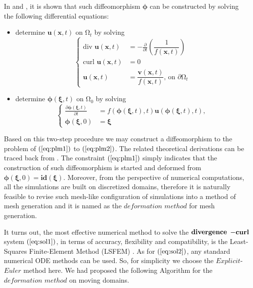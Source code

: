 \documentclass{article}
\theoremstyle{definition}
\theoremstyle{remark}
\numberwithin{equation}{section}
\numberwithin{subsection}{section}
\begin{document}
In \cite{Cai} and \cite{Dion}, it is shown that such diffeomorphism $\pmb{\phi}$ can be constructed by solving the following differential equations: 
	\begin{itemize}
	\item determine $\pmb{u}(\pmb{x},t)$ on $\mathrm{\Omega}_t$ by solving
	\begin{equation}\label{eq:sol1}
	\left\{
		\begin{aligned}
		\text{div } \pmb{u}(\pmb{x},t)& = -\frac{\partial}{\partial t}(\dfrac{1}{f(\pmb{x},t)}) \\
		\text{curl } \pmb{u}(\pmb{x},t)& = 0\\
		\pmb{u}(\pmb{x},t)& = \dfrac{\pmb{v}(\pmb{x},t)}{f(\pmb{x},t)} \text{, on } \partial\mathrm{\Omega}_t
		\end{aligned}\right.
	\end{equation}
	\item determine $\pmb{\phi}(\pmb{\xi},t)$ on $\mathrm{\Omega}_0$ by solving	
		\begin{equation}\label{eq:sol2}
		\left\{
			\begin{aligned}
			\frac{\partial \pmb{\phi}(\pmb{\xi},t)}{\partial t}& = f(\pmb{\phi}(\pmb{\xi},t),t) \pmb{u}(\pmb{\phi}(\pmb{\xi},t),t), \\
			\pmb{\phi}(\pmb{\xi},0)& = \pmb{\xi}
			\end{aligned}\right.
		\end{equation}
	\end{itemize}
	
Based on this two-step procedure we may construct a diffeomorphism to the problem of $(\ref{eq:plm1})$ to $(\ref{eq:plm2})$. The related theoretical derivations can be traced back from \cite{XiChen}. The constraint $(\ref{eq:plm1})$ simply indicates that the construction of such diffeomorphism is started and deformed from $\pmb{\phi}(\pmb{\xi},0)=\pmb{id}(\pmb{\xi})$.  Moreover, from the perspective of numerical computations, all the simulations are built on discretized domains, therefore it is naturally feasible to revise such mesh-like configuration of simulations into a method of mesh generation and it is named as the $deformation$ $method$ for mesh generation.


It turns out, the most effective numerical method to solve the $\bf{divergence}$ $\bf{-curl}$ system $(\ref{eq:sol1})$, in terms of accuracy, flexibility and compatibility, is the Least-Squares Finite-Element Method (LSFEM) \cite{Cai} \cite{Dion} \cite{Jiang}. As for $(\ref{eq:sol2})$, any standard numerical ODE methods can be used. So, for simplicity we choose the $Explicit$-$Euler$ method here. We had proposed the following Algorithm for the $deformation$ $method$ on moving domains.
\end{document}
